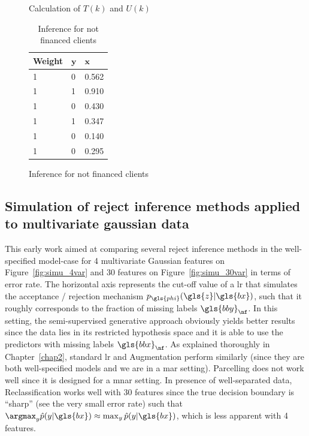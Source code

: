\begin{table}
{\begin{multicols}{3}
\begin{subfigure}[t]{0.31\textwidth}
\caption{Calculation of $T(k)$ and $U(k)$}
\label{parcel:sfig2}
\end{subfigure}

\columnbreak

\begin{subfigure}[t]{0.31\textwidth}
\begin{center}
\begin{adjustbox}{max width=\textwidth}
\begin{tabular}{l l l}
\toprule
\textbf{Weight} & \textbf{${\bm{y}}$} & \textbf{${\bm{x}}$}\\
\midrule
1 & 0 & 0.562 \\
1 & 1 & 0.910 \\
1 & 0 & 0.430 \\
1 & 1 & 0.347 \\
1 & 0 & 0.140 \\
1 & 0 & 0.295 \\
\bottomrule
\end{tabular}
\end{adjustbox}
\end{center}

\caption{Inference for not financed clients}
\label{parcel:sfig3}
\end{subfigure}

\end{multicols}
}
\end{table}



\subsection{Simulation of reject inference methods applied to multivariate gaussian data} \label{subsec:app_reject_sim}

This early work aimed at comparing several reject inference methods in the well-specified model-case for 4 multivariate Gaussian features on Figure~\ref{fig:simu_4var} and 30 features on Figure~\ref{fig:simu_30var} in terms of error rate. The horizontal axis represents the cut-off value of a \gls{lr} that simulates the acceptance / rejection mechanism $p_{\gls{phi}}(\gls{z} | \gls{bx})$, such that it roughly corresponds to the fraction of missing labels $\gls{bby}_{\nf}$. In this setting, the semi-supervised generative approach obviously yields better results since the data lies in its restricted hypothesis space and it is able to use the predictors with missing labels $\gls{bbx}_{\nf}$. As explained thoroughly in Chapter~\ref{chap2}, standard \gls{lr} and Augmentation perform similarly (since they are both well-specified models and we are in a \gls{mar} setting). Parcelling does not work well since it is designed for a \gls{mnar} setting. In presence of well-separated data, Reclassification works well with 30 features since the true decision boundary is ``sharp'' (see the very small error rate) such that $\argmax_y \hat{p}(y | \gls{bx}) \approx \max_y \hat{p}(y | \gls{bx})$, which is less apparent with 4 features.


